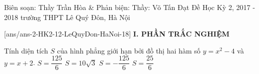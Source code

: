 \begin{name}
{Biên soạn: Thầy Trần Hòa \& Phản biện: Thầy: Võ Tấn Đạt}
		{Đề Học Kỳ 2, 2017 - 2018 trường THPT Lê Quý Đôn, Hà Nội}
	\end{name}
	\setcounter{ex}{0}\setcounter{bt}{0}
	[ans/ans-2-HK2-12-LeQuyDon-HaNoi-18]
\noindent\textbf{I. PHẦN TRẮC NGHIỆM}
\begin{ex}%
	Tính diện tích $S$ của hình phẳng giới hạn bởi đồ thị hai hàm số $y=x^2-4$ và $y=x+2$.	
	\choice
	{\True $S=\dfrac{125}{6}$}
	{$S=10\sqrt{3}$}
	{$S=-\dfrac{125}{6}$}
	{$S=\dfrac{25}{6}$}
\end{ex}
